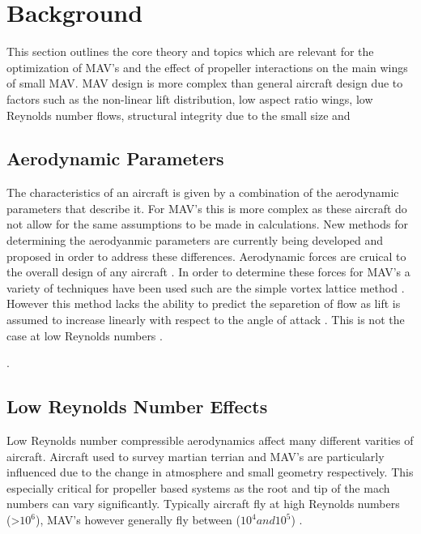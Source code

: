 \graphicspath{{./Figs/}}

\chapter{Background} 
This section outlines the core theory and topics which are relevant for the optimization of MAV's and the effect of propeller interactions on the main wings of small MAV. MAV design is more complex than general aircraft design due to factors such as the non-linear lift distribution, low aspect ratio wings, low Reynolds number flows, structural integrity due to the small size and 


\section{Aerodynamic Parameters}
\label{sec:AerodynamicParameters}
The characteristics of an aircraft is given by a combination of the aerodynamic parameters that describe it. For MAV's this is more complex as these aircraft do not allow for the same assumptions to be made in calculations. New methods for determining the aerodyanmic parameters are currently being developed and proposed \cite{Shen2018} \cite{Roberts2011} in order to address these differences. Aerodynamic forces are cruical to the overall design of any aircraft \cite{Aero2012}. In order to determine these forces for MAV's a variety of techniques have been used such are the simple vortex lattice method \cite{Stewart2007} \cite{Hard2010}. However this method lacks the ability to predict the separetion of flow as lift is assumed to increase linearly with respect to the angle of attack \cite{Aboelezz2020}. This is not the case at low Reynolds numbers \cite{Zhang2022}. 

\cite{DeLuca2004}.
\cite{Chinwicharnam2013}

\section{Low Reynolds Number Effects }
\label{sec:LowReynolds}
Low Reynolds number compressible aerodynamics affect many different varities of aircraft. Aircraft used to survey martian terrian and MAV's are particularly influenced due to the change in atmosphere and small geometry respectively\cite{Munday2015}. This especially critical for propeller based systems as the root and tip of the mach numbers can vary significantly\cite{Munday2015}. Typically aircraft fly at high Reynolds numbers (>$10^{6}$), MAV's however generally fly between ($10^{4} and 10^{5}$) \cite{Winslow2018}.


